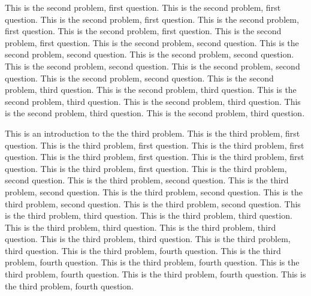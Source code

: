 \documentclass{cisXXX} %
\begin{document}
\HWproblem
\HWsubproblem
This is the second problem, first question.
This is the second problem, first question.
This is the second problem, first question.
This is the second problem, first question.
This is the second problem, first question.
This is the second problem, first question.
\HWsubproblem
This is the second problem, second question.
This is the second problem, second question.
This is the second problem, second question.
This is the second problem, second question.
This is the second problem, second question.
This is the second problem, second question.
\HWsubproblem
This is the second problem, third question.
This is the second problem, third question.
This is the second problem, third question.
This is the second problem, third question.
This is the second problem, third question.
This is the second problem, third question.


\HWproblem
This is an introduction to the the third problem.
\HWsubproblem
This is the third problem, first question.
This is the third problem, first question.
This is the third problem, first question.
This is the third problem, first question.
This is the third problem, first question.
This is the third problem, first question.
\HWsubproblem
This is the third problem, second question.
This is the third problem, second question.
This is the third problem, second question.
This is the third problem, second question.
This is the third problem, second question.
This is the third problem, second question.
\HWsubproblem
This is the third problem, third question.
This is the third problem, third question.
This is the third problem, third question.
This is the third problem, third question.
This is the third problem, third question.
This is the third problem, third question.
\HWsubproblem
This is the third problem, fourth question.
This is the third problem, fourth question.
This is the third problem, fourth question.
This is the third problem, fourth question.
This is the third problem, fourth question.
This is the third problem, fourth question.
\end{document}

